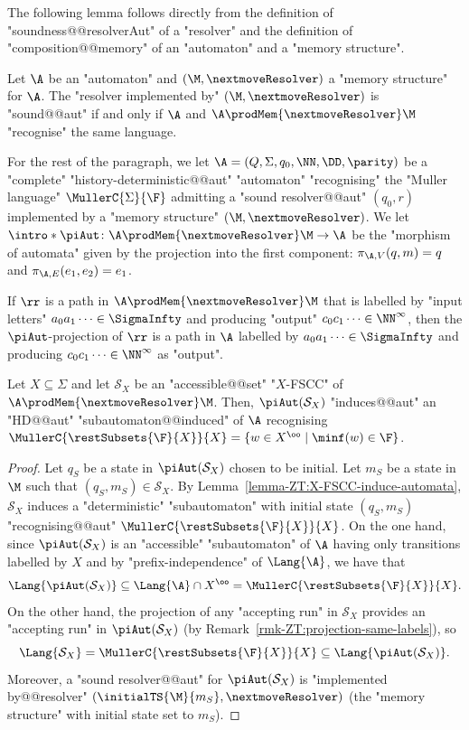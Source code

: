 \documentclass[10pt,a4paper]{amsart}
\renewcommand{\S}{\mathcal{S}}
\renewcommand{\SS}{\Sigma}
\begin{document}
The following lemma follows directly from the definition of "soundness@@resolverAut" of a "resolver" and the definition of "composition@@memory" of an "automaton" and a "memory structure".
\begin{lemma}\label{lemma:validity-product-by-memory-HD-aut}
	Let $\A$ be an "automaton" and $(\M, \nextmoveResolver)$ a "memory structure" for $\A$. The "resolver implemented by" $(\M, \nextmoveResolver)$ is "sound@@aut" if and only if $\A$ and $\A\prodMem{\nextmoveResolver} \M$ "recognise" the same language. 
\end{lemma}


For the rest of the paragraph, we let $\A = (Q,\Sigma, q_0, \NN, \DD, \parity)$ be a "complete" "history-deterministic@@aut" "automaton" "recognising" the "Muller language" $\MullerC{\SS}{\F}$ admitting a "sound resolver@@aut" $(q_0,r)$ implemented by a "memory structure"  $(\M, \nextmoveResolver)$.
\AP We let $\intro*\piAut\colon \A \prodMem{\nextmoveResolver} \M \to \A$ be the "morphism of automata" given by the projection into the first component: $\pi_{\A,V}(q,m) = q$ and $\pi_{\A,E}(e_1,e_2) = e_1$.

\begin{remark}\label{rmk-ZT:projection-same-labels}
	If $\rr$ is a path in $\A \prodMem{\nextmoveResolver} \M$ that is labelled by "input letters" $a_0a_1\dots \in \SigmaInfty$ and producing "output" $c_0c_1\dots \in \NN^\infty$, then the $\piAut$-projection of $\rr$ is a path in $\A$ labelled  by $a_0a_1\dots \in \SigmaInfty$ and producing $c_0c_1\dots \in \NN^\infty$ as "output". 
\end{remark}

\begin{lemma}\label{lemma-ZT:X-FSCC-in-product-induce-subautomaton}
	Let $X\subseteq \SS$ and let $\S_X$ be an "accessible@@set" "$X$-FSCC" of $\A \prodMem{\nextmoveResolver} \M$. Then, $\piAut(\S_X)$ "induces@@aut" an "HD@@aut" "subautomaton@@induced" of $\A$ recognising $\MullerC{\restSubsets{\F}{X}}{X} = \{w\in X^\oo \mid \minf(w)\in \F\}$.
\end{lemma}
\begin{proof}
	Let $q_S$ be a state in $\piAut(\S_X)$ chosen to be initial. Let $m_S$ be a state in $\M$ such that $(q_S, m_S)\in \S_X$. By Lemma~\ref{lemma-ZT:X-FSCC-induce-automata}, $\S_X$ induces a "deterministic" "subautomaton" with initial state $(q_S, m_S)$ "recognising@@aut" $\MullerC{\restSubsets{\F}{X}}{X}$. 
	On the one hand, since $\piAut(\S_X)$ is an "accessible" "subautomaton" of $\A$ having only transitions labelled by $X$ and by "prefix-independence" of $\Lang{\A}$, we have that 
	\[ \Lang{\piAut(\S_X)} \subseteq \Lang{\A}\cap X^\oo = \MullerC{\restSubsets{\F}{X}}{X}. \]
	On the other hand, the projection of any "accepting run" in $\S_X$ provides an "accepting run" in $\piAut(\S_X)$ (by Remark~\ref{rmk-ZT:projection-same-labels}), so 
	\[\Lang{\S_X} = \MullerC{\restSubsets{\F}{X}}{X}\subseteq \Lang{\piAut(\S_X)}.\] 
	Moreover, a "sound resolver@@aut" for $\piAut(\S_X)$ is "implemented by@@resolver" $(\initialTS{\M}{m_S}, \nextmoveResolver)$ (the "memory structure" with initial state set to $m_S$).
\end{proof}
\end{document}
